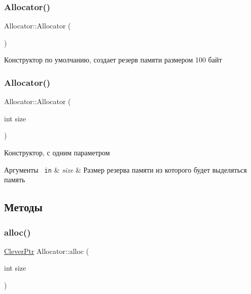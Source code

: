 \subsubsection{\texorpdfstring{Allocator()}{Allocator()}\hspace{0.1cm}{\footnotesize\ttfamily [1/2]}}
{\footnotesize\ttfamily Allocator\+::\+Allocator (\begin{DoxyParamCaption}{ }\end{DoxyParamCaption})}

Конструктор по умолчанию, создает резерв памяти размером 100 байт \mbox{\label{class_allocator_af37df7ff59070823ef0e9796bea63518}} 
\subsubsection{\texorpdfstring{Allocator()}{Allocator()}\hspace{0.1cm}{\footnotesize\ttfamily [2/2]}}
{\footnotesize\ttfamily Allocator\+::\+Allocator (\begin{DoxyParamCaption}\item[{int}]{size }\end{DoxyParamCaption})}

Конструктор, с одним параметром 
\begin{DoxyParams}[1]{Аргументы}
\mbox{\texttt{ in}}  & {\em size} & Размер резерва памяти из которого будет выделяться память \\
\hline
\end{DoxyParams}


\subsection{Методы}
\mbox{\label{class_allocator_afaa7d76d46c8393ccf5a9fb0ba8d0c2f}} 
\subsubsection{\texorpdfstring{alloc()}{alloc()}}
{\footnotesize\ttfamily \mbox{\hyperlink{class_clever_ptr}{Clever\+Ptr}} Allocator\+::alloc (\begin{DoxyParamCaption}\item[{int}]{size }\end{DoxyParamCaption})}

